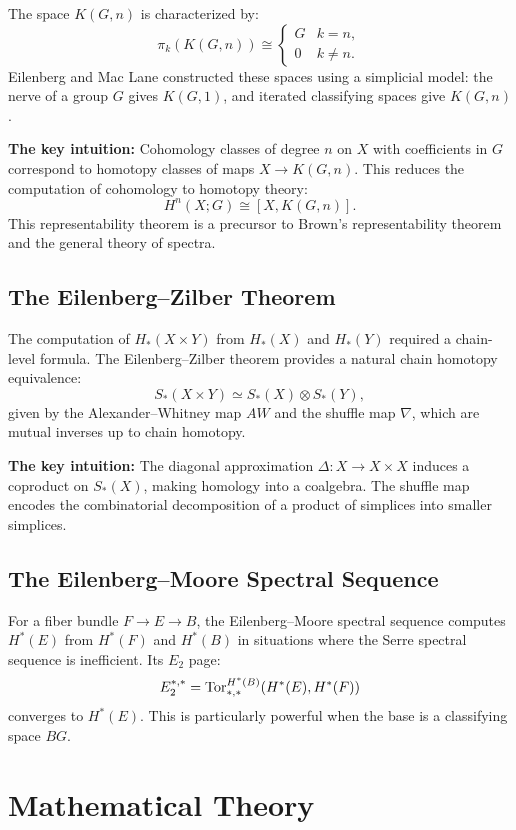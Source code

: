 The space $K(G,n)$ is characterized by:
\[
\pi_k(K(G,n)) \cong 
\begin{cases}
G & k = n, \\
0 & k \neq n.
\end{cases}
\]
Eilenberg and Mac Lane constructed these spaces using a simplicial model: the nerve of a group $G$ gives $K(G,1)$, and iterated classifying spaces give $K(G,n)$.

\textbf{The key intuition:} Cohomology classes of degree $n$ on $X$ with coefficients in $G$ correspond to homotopy classes of maps $X \to K(G,n)$. This reduces the computation of cohomology to homotopy theory:
\[
H^n(X; G) \cong [X, K(G,n)].
\]
This representability theorem is a precursor to Brown's representability theorem and the general theory of spectra.

\subsection{The Eilenberg--Zilber Theorem}

The computation of $H_*(X \times Y)$ from $H_*(X)$ and $H_*(Y)$ required a chain-level formula. The Eilenberg--Zilber theorem provides a natural chain homotopy equivalence:
\[
S_*(X \times Y) \simeq S_*(X) \otimes S_*(Y),
\]
given by the Alexander--Whitney map $AW$ and the shuffle map $\nabla$, which are mutual inverses up to chain homotopy.

\textbf{The key intuition:} The diagonal approximation $\Delta: X \to X \times X$ induces a coproduct on $S_*(X)$, making homology into a coalgebra. The shuffle map encodes the combinatorial decomposition of a product of simplices into smaller simplices.

\subsection{The Eilenberg--Moore Spectral Sequence}

For a fiber bundle $F \to E \to B$, the Eilenberg--Moore spectral sequence computes $H^*(E)$ from $H^*(F)$ and $H^*(B)$ in situations where the Serre spectral sequence is inefficient. Its $E_2$ page:
\[
E_2^{*,*} = \operatorname{Tor}^{H^*(B)}_{*,*}(H^*(E), H^*(F))
\]
converges to $H^*(E)$. This is particularly powerful when the base is a classifying space $BG$.

\section{Mathematical Theory}


